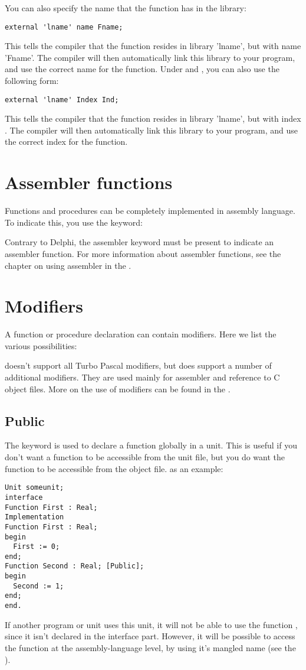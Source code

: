 \documentclass{report}
\begin{document}
You can also specify the name that the function has in the library:
\begin{verbatim}
external 'lname' name Fname;
\end{verbatim}
This tells the compiler that the function resides in library 'lname',
but with name 'Fname'. The compiler will then automatically link this
library to your program, and use the correct name for the function.
Under \windows and \ostwo, you can also use the following form:
\begin{verbatim}
external 'lname' Index Ind;
\end{verbatim}
This tells the compiler that the function resides in library 'lname',
but with index . The compiler will then automatically
link this library to your program, and use the correct index for the
function.

\section{Assembler functions}
Functions and procedures can be completely implemented in assembly
language. To indicate this, you use the  keyword:

Contrary to Delphi, the assembler keyword must be present to indicate an
assembler function.
For more information about assembler functions, see the chapter on using
assembler in the \progref.


\section{Modifiers}
A function or procedure declaration can contain modifiers. Here we list the
various possibilities:

\fpc doesn't support all Turbo Pascal modifiers, but
does support a number of additional modifiers. They are used mainly for assembler and
reference to C object files. More on the use of modifiers can be found in
the \progref.

\subsection{Public}
The  keyword is used to declare a function globally in a unit.
This is useful if you don't want a function to be accessible from the unit
file, but you do want the function to be accessible from the object file.
as an example:
\begin{verbatim}
Unit someunit;
interface
Function First : Real;
Implementation
Function First : Real;
begin
  First := 0;
end;
Function Second : Real; [Public];
begin
  Second := 1;
end;
end.
\end{verbatim}
If another program or unit uses this unit, it will not be able to use the
function , since it isn't declared in the interface part.
However, it will be possible to access the function  at the
assembly-language level, by using it's mangled name (see the \progref).
\end{document}
